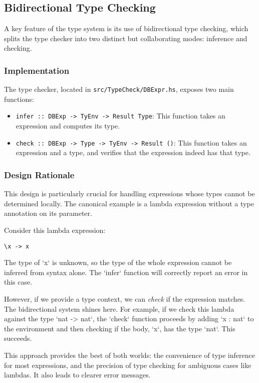 \subsection{Bidirectional Type Checking}

A key feature of the type system is its use of bidirectional type checking, which splits the type checker into two distinct but collaborating modes: inference and checking.

\subsubsection{Implementation}
The type checker, located in \texttt{src/TypeCheck/DBExpr.hs}, exposes two main functions:
\begin{itemize}
    \item \texttt{infer :: DBExp -> TyEnv -> Result Type}: This function takes an expression and computes its type.
    \item \texttt{check :: DBExp -> Type -> TyEnv -> Result ()}: This function takes an expression and a type, and verifies that the expression indeed has that type.
\end{itemize}

\subsubsection{Design Rationale}
This design is particularly crucial for handling expressions whose types cannot be determined locally. The canonical example is a lambda expression without a type annotation on its parameter.

Consider this lambda expression:
\begin{verbatim}
\x -> x
\end{verbatim}
The type of `x` is unknown, so the type of the whole expression cannot be inferred from syntax alone. The `infer` function will correctly report an error in this case.

However, if we provide a type context, we can \textit{check} if the expression matches. The bidirectional system shines here. For example, if we check this lambda against the type `nat -> nat`, the `check` function proceeds by adding `x : nat` to the environment and then checking if the body, `x`, has the type `nat`. This succeeds.

This approach provides the best of both worlds: the convenience of type inference for most expressions, and the precision of type checking for ambiguous cases like lambdas. It also leads to clearer error messages.


